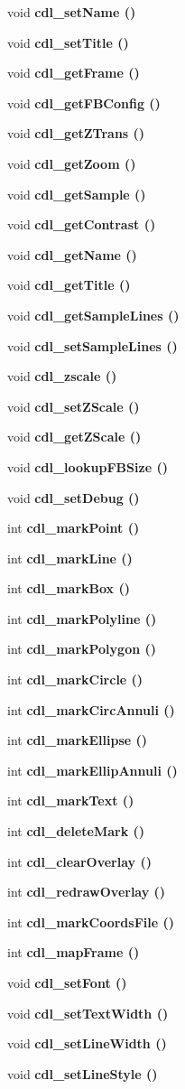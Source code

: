\begin{CompactItemize}
\item 
void \bf{cdl\_\-set\-Name} ()
\item 
void \bf{cdl\_\-set\-Title} ()
\item 
void \bf{cdl\_\-get\-Frame} ()
\item 
void \bf{cdl\_\-get\-FBConfig} ()
\item 
void \bf{cdl\_\-get\-ZTrans} ()
\item 
void \bf{cdl\_\-get\-Zoom} ()
\item 
void \bf{cdl\_\-get\-Sample} ()
\item 
void \bf{cdl\_\-get\-Contrast} ()
\item 
void \bf{cdl\_\-get\-Name} ()
\item 
void \bf{cdl\_\-get\-Title} ()
\item 
void \bf{cdl\_\-get\-Sample\-Lines} ()
\item 
void \bf{cdl\_\-set\-Sample\-Lines} ()
\item 
void \bf{cdl\_\-zscale} ()
\item 
void \bf{cdl\_\-set\-ZScale} ()
\item 
void \bf{cdl\_\-get\-ZScale} ()
\item 
void \bf{cdl\_\-lookup\-FBSize} ()
\item 
void \bf{cdl\_\-set\-Debug} ()
\item 
int \bf{cdl\_\-mark\-Point} ()
\item 
int \bf{cdl\_\-mark\-Line} ()
\item 
int \bf{cdl\_\-mark\-Box} ()
\item 
int \bf{cdl\_\-mark\-Polyline} ()
\item 
int \bf{cdl\_\-mark\-Polygon} ()
\item 
int \bf{cdl\_\-mark\-Circle} ()
\item 
int \bf{cdl\_\-mark\-Circ\-Annuli} ()
\item 
int \bf{cdl\_\-mark\-Ellipse} ()
\item 
int \bf{cdl\_\-mark\-Ellip\-Annuli} ()
\item 
int \bf{cdl\_\-mark\-Text} ()
\item 
int \bf{cdl\_\-delete\-Mark} ()
\item 
int \bf{cdl\_\-clear\-Overlay} ()
\item 
int \bf{cdl\_\-redraw\-Overlay} ()
\item 
int \bf{cdl\_\-mark\-Coords\-File} ()
\item 
int \bf{cdl\_\-map\-Frame} ()
\item 
void \bf{cdl\_\-set\-Font} ()
\item 
void \bf{cdl\_\-set\-Text\-Width} ()
\item 
void \bf{cdl\_\-set\-Line\-Width} ()
\item 
void \bf{cdl\_\-set\-Line\-Style} ()
\end{CompactItemize}


